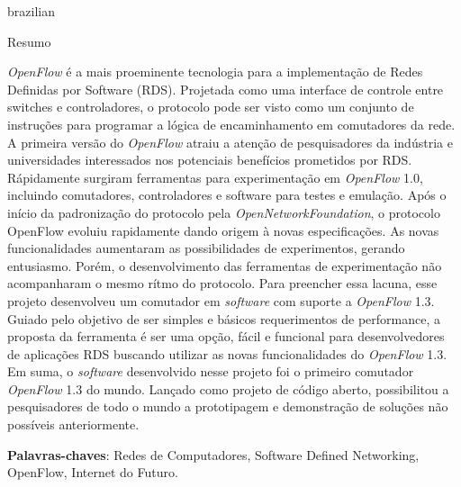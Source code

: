 \begin{resumo}
    \begin{otherlanguage*}{brazilian}
    \begin{center}{\ABNTEXchapterfont\huge Resumo}\end{center}
        \textit{OpenFlow} é a mais proeminente tecnologia para a implementaç\~{a}o de Redes Definidas por Software (RDS). Projetada como uma interface de controle entre switches e controladores, o protocolo pode ser visto como um conjunto de instruç\~{o}es para programar a l\'{o}gica de encaminhamento em comutadores da rede. A primeira vers\~{a}o do \textit{OpenFlow} atraiu a atenção de pesquisadores da ind\'{u}stria e universidades interessados nos potenciais benef\'{i}cios prometidos por RDS. R\'{a}pidamente surgiram ferramentas para experimentação em \textit{OpenFlow} 1.0, incluindo comutadores, controladores e software para testes e emulaç\~{a}o. Ap\'{o}s o in\'{i}cio da padronizaç\~{a}o do protocolo pela \textit{OpenNetworkFoundation}, o protocolo OpenFlow evoluiu rapidamente dando origem \`{a} novas especificaç\~{o}es. As novas funcionalidades aumentaram as possibilidades de experimentos, gerando entusiasmo. Porém, o desenvolvimento das ferramentas de experimentaç\~{a}o n\~{a}o acompanharam o mesmo r\'{i}tmo do protocolo. Para preencher essa lacuna, esse projeto desenvolveu um comutador em \textit{software} com suporte a \textit{OpenFlow} 1.3. Guiado pelo objetivo de ser simples e básicos requerimentos de performance, a proposta da ferramenta \'{e} ser uma opç\~{a}o, f\'{a}cil e funcional para desenvolvedores de aplicaç\~{o}es RDS  buscando utilizar as novas funcionalidades do \textit{OpenFlow} 1.3. Em suma, o \textit{software} desenvolvido nesse projeto foi o primeiro comutador \textit{OpenFlow} 1.3 do mundo. Lançado como projeto de c\'{o}digo aberto, possibilitou a pesquisadores de todo o mundo a prototipagem e demonstraç\~{a}o de soluç\~{o}es n\~{a}o poss\'{i}veis anteriormente.

    \vspace{\onelineskip}

    \noindent\textbf{Palavras-chaves}: Redes de Computadores, Software Defined Networking, OpenFlow, Internet do Futuro. 

    \end{otherlanguage*}
\end{resumo}



